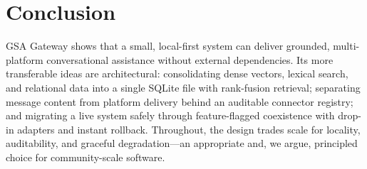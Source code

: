 \documentclass[11pt,letterpaper]{article}
\begin{document}
\section{Conclusion}

GSA Gateway shows that a small, local-first system can deliver grounded,
multi-platform conversational assistance without external dependencies. Its more
transferable ideas are architectural: consolidating dense vectors, lexical search, and
relational data into a single SQLite file with rank-fusion retrieval; separating
message content from platform delivery behind an auditable connector registry; and
migrating a live system safely through feature-flagged coexistence with drop-in
adapters and instant rollback. Throughout, the design trades scale for locality,
auditability, and graceful degradation---an appropriate and, we argue, principled
choice for community-scale software.
\end{document}
